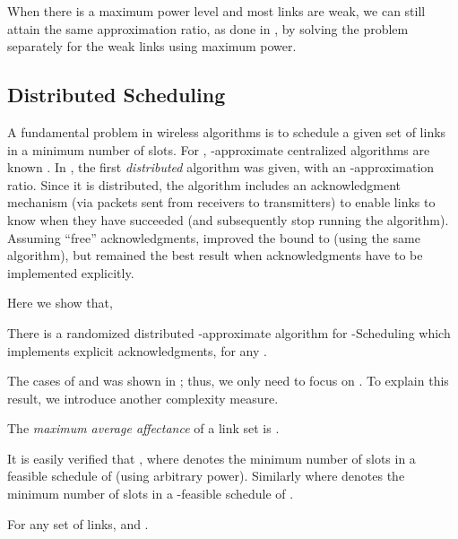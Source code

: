 \documentclass[11pt]{amsart}
\newcommand{\prob}[1]{\textsf{#1}}  \newcommand{\alg}[1]{\textbf{#1}}
\begin{document}
When there is a maximum power level and most links are weak,
we can still attain the same approximation ratio, as done in \cite{SODA11}, by solving the problem separately for the weak links using maximum power.
\iffalse
The following corollary follows similarly from Theorem \ref{thm:indind} and Theorem \ref{thm:appx}:

\begin{corollary}
There is an -approximate algorithm for
the capacity problem for any  on non-weak links.
\label{cor:appx}
\end{corollary}
\fi



\subsection{Distributed Scheduling}

A fundamental problem in wireless algorithms is to schedule a given set of links in a minimum number of slots. 
For  , -approximate centralized algorithms are known \cite{SODA11}.
In \cite{KV10}, the first \emph{distributed} algorithm was given, with an -approximation ratio. 
Since it is distributed, the algorithm
includes an acknowledgment mechanism (via packets sent from receivers to transmitters) to enable links to know when they have succeeded (and subsequently stop running the algorithm). Assuming ``free'' acknowledgments, \cite{HM11a} improved
the bound to   (using the same algorithm), but \cite{KV10} remained the best result when acknowledgments have to be implemented explicitly. 

Here we show that, 
\begin{theorem}
There is a randomized distributed -approximate algorithm 
for \prob{-Scheduling} which implements explicit acknowledgments, for any . 
\end{theorem}

The cases of  and  was shown in \cite{HM11a}; thus, we only need to focus on .
To explain this result, we introduce another complexity measure. 

\begin{defn} \cite{KV10} 
The \emph{maximum average affectance}  of a link set 
 is 
.
\end{defn}
It is easily verified that ,
where  denotes the minimum number of slots in a feasible schedule of  (using arbitrary power).
Similarly  where  denotes the minimum number of slots in a -feasible schedule of .

\begin{corollary}
For any set  of links,  and .
\label{cor:avgaff}
\end{corollary}
\end{document}

